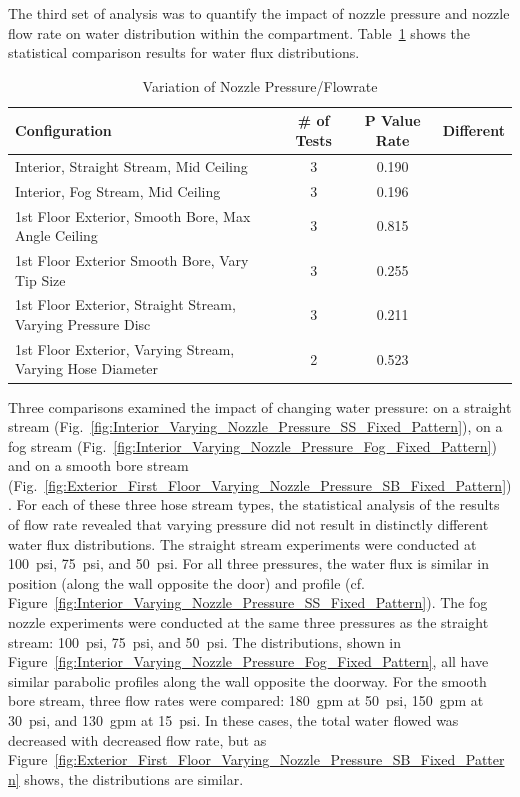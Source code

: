 \documentclass[12pt,oneside]{book}
\begin{document}
The third set of analysis was to quantify the impact of nozzle pressure and nozzle flow rate on water distribution within the compartment. Table~\ref{tab:add_pressure} shows the statistical comparison results for water flux distributions. 

\begin{table}[!ht]
\centering
\footnotesize
\caption{Variation of Nozzle Pressure/Flowrate}
\label{tab:add_pressure}
\begin{tabular}{lccc}
\toprule[1.5pt]
Configuration & \# of Tests & P Value Rate & Different \\ 
\midrule
 Interior, Straight Stream, Mid Ceiling                      & 3   & 0.190   &            \\
 Interior, Fog Stream, Mid Ceiling                           & 3   & 0.196   &            \\
 1st Floor Exterior, Smooth Bore, Max Angle Ceiling          & 3   & 0.815   &            \\
 1st Floor Exterior Smooth Bore, Vary Tip Size               & 3   & 0.255   &            \\
 1st Floor Exterior, Straight Stream, Varying Pressure Disc  & 3   & 0.211   &            \\
 1st Floor Exterior, Varying Stream, Varying Hose Diameter   & 2   & 0.523   &            \\
\bottomrule[1.25pt]
\end{tabular}
\end{table}

Three comparisons examined the impact of changing water pressure: on a straight stream (Fig.~\ref{fig:Interior_Varying_Nozzle_Pressure_SS_Fixed_Pattern}), on a fog stream (Fig.~\ref{fig:Interior_Varying_Nozzle_Pressure_Fog_Fixed_Pattern}) and on a smooth bore stream (Fig.~\ref{fig:Exterior_First_Floor_Varying_Nozzle_Pressure_SB_Fixed_Pattern}). For each of these three hose stream types, the statistical analysis of the results of flow rate revealed that varying pressure did not result in distinctly different water flux distributions. The straight stream experiments were conducted at 100~psi, 75~psi, and 50~psi. For all three pressures, the water flux is similar in position (along the wall opposite the door) and profile (cf. Figure~\ref{fig:Interior_Varying_Nozzle_Pressure_SS_Fixed_Pattern}). The fog nozzle experiments were conducted at the same three pressures as the straight stream: 100~psi, 75~psi, and 50~psi. The distributions, shown in Figure~\ref{fig:Interior_Varying_Nozzle_Pressure_Fog_Fixed_Pattern}, all have similar parabolic profiles along the wall opposite the doorway. For the smooth bore stream, three flow rates were compared: 180~gpm at 50~psi, 150~gpm at 30~psi, and 130~gpm at 15~psi. In these cases, the total water flowed was decreased with decreased flow rate, but as Figure~\ref{fig:Exterior_First_Floor_Varying_Nozzle_Pressure_SB_Fixed_Pattern} shows, the distributions are similar. 
\end{document}
